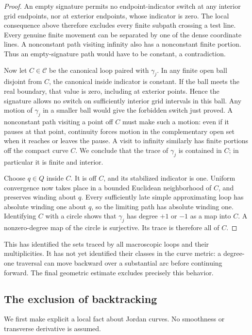 \begin{proof}
An empty signature permits no endpoint-indicator switch at any interior grid endpoints, nor at exterior endpoints, whose indicator is zero. The local consequence above therefore excludes every finite subpath crossing a test line. Every genuine finite movement can be separated by one of the dense coordinate lines. A nonconstant path visiting infinity also has a nonconstant finite portion. Thus an empty-signature path would have to be constant, a contradiction.

Now let $C\in\mathcal C$ be the canonical loop paired with $\gamma_j$. In any finite open ball disjoint from $C$, the canonical inside indicator is constant. If the ball meets the real boundary, that value is zero, including at exterior points. Hence the signature allows no switch on sufficiently interior grid intervals in this ball. Any motion of $\gamma_j$ in a smaller ball would give the forbidden switch just proved. A nonconstant path visiting a point off $C$ must make such a motion: even if it pauses at that point, continuity forces motion in the complementary open set when it reaches or leaves the pause. A visit to infinity similarly has finite portions off the compact curve $C$. We conclude that the trace of $\gamma_j$ is contained in $C$; in particular it is finite and interior.

Choose $q\in Q$ inside $C$. It is off $C$, and its stabilized indicator is one. Uniform convergence now takes place in a bounded Euclidean neighborhood of $C$, and preserves winding about $q$. Every sufficiently late simple approximating loop has absolute winding one about $q$, so the limiting path has absolute winding one. Identifying $C$ with a circle shows that $\gamma_j$ has degree $+1$ or $-1$ as a map into $C$. A nonzero-degree map of the circle is surjective. Its trace is therefore all of $C$.
\end{proof}

This has identified the sets traced by all macroscopic loops and their multiplicities. It has not yet identified their classes in the curve metric: a degree-one traversal can move backward over a substantial arc before continuing forward. The final geometric estimate excludes precisely this behavior.

\subsection{The exclusion of backtracking}

We first make explicit a local fact about Jordan curves. No smoothness or transverse derivative is assumed.

